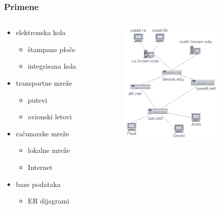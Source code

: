 \documentclass[compress,aspectratio=169]{beamer}
\begin{document}
\begin{frame}[fragile]
  \frametitle{Primene}
  \begin{columns}
    \begin{column}[t]{6cm}
      \begin{itemize}
        \item elektronska kola
        \begin{itemize}
          \item štampane ploče
          \item integrisana kola
        \end{itemize}
        \item transportne mreže
        \begin{itemize}
          \item putevi
          \item avionski letovi
        \end{itemize}
        \item računarske mreže
        \begin{itemize}
          \item lokalne mreže
          \item Internet
        \end{itemize}
        \item baze podataka
        \begin{itemize}
          \item ER dijagrami
        \end{itemize}
      \end{itemize}
    \end{column}
    \begin{column}[t]{6cm}
      \begin{center}
        \includegraphics[width=5cm]{asp-14-pic03.png}
      \end{center}
    \end{column}
  \end{columns}
\end{frame}
\end{document}
